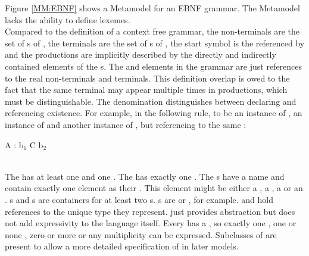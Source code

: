 Figure \ref{MM:EBNF} shows a Metamodel for an EBNF grammar. The Metamodel lacks the ability to define lexemes.  \\
Compared to the definition of a context free grammar, the non-terminals are the set of s of , the terminals are the set of s of , the start symbol is the  referenced by  and the productions are implicitly described by the directly and indirectly contained elements of the s. The  and  elements in the grammar are just references to the real non-terminals and terminals. This definition overlap is owed to the fact that the same terminal may appear multiple times in productions, which must be distinguishable. The denomination distinguishes between declaring and referencing existence. For example, in the following rule,  to be an instance of ,  an instance of  and  another instance of , but referencing to the same :
\\\begin{code}
A : b$_1$ C b$_2$
\end{code}\\

The  has at least one  and one . The  has exactly one . The s have a name and contain exactly one element as their . This element might be either a , a , a  or an . s and s are containers for at least two s. s are  or , for example.  and  hold references to the unique type they represent.  just provides abstraction but does not add expressivity to the language itself. Every  has a , so exactly one , one or none , zero or more \code{+} or any multiplicity \code{*} can be expressed. Subclasses of  are present to allow a more detailed specification of  in later models.



